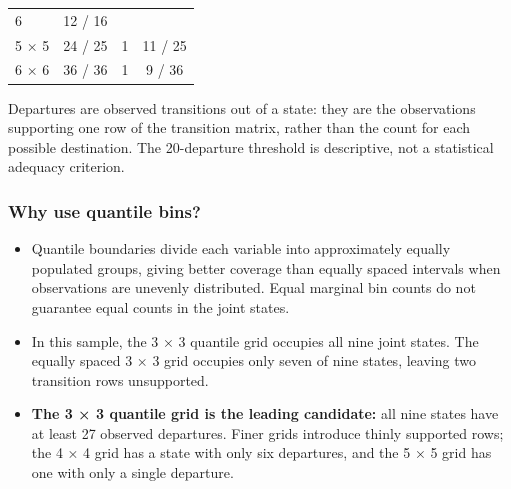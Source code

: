 \documentclass[10pt,]{article}
\providecommand{\tightlist}{%
  \setlength{\itemsep}{0pt}\setlength{\parskip}{0pt}}
\begin{document}
\begin{longtable}[]{@{}lccc@{}}
\begin{minipage}[t]{0.30\columnwidth}
6\strut
\end{minipage} & \begin{minipage}[t]{0.27\columnwidth}\centering\strut
12 / 16\strut
\end{minipage}\tabularnewline
\begin{minipage}[t]{0.14\columnwidth}\raggedright\strut
5 × 5\strut
\end{minipage} & \begin{minipage}[t]{0.18\columnwidth}\centering\strut
24 / 25\strut
\end{minipage} & \begin{minipage}[t]{0.30\columnwidth}\centering\strut
1\strut
\end{minipage} & \begin{minipage}[t]{0.27\columnwidth}\centering\strut
11 / 25\strut
\end{minipage}\tabularnewline
\begin{minipage}[t]{0.14\columnwidth}\raggedright\strut
6 × 6\strut
\end{minipage} & \begin{minipage}[t]{0.18\columnwidth}\centering\strut
36 / 36\strut
\end{minipage} & \begin{minipage}[t]{0.30\columnwidth}\centering\strut
1\strut
\end{minipage} & \begin{minipage}[t]{0.27\columnwidth}\centering\strut
9 / 36\strut
\end{minipage}\tabularnewline
\bottomrule
\end{longtable}

Departures are observed transitions out of a state: they are the
observations supporting one row of the transition matrix, rather than
the count for each possible destination. The 20-departure threshold is
descriptive, not a statistical adequacy criterion.

\subsubsection{Why use quantile bins?}\label{why-use-quantile-bins}

\begin{itemize}
\tightlist
\item
  Quantile boundaries divide each variable into approximately equally
  populated groups, giving better coverage than equally spaced intervals
  when observations are unevenly distributed. Equal marginal bin counts
  do not guarantee equal counts in the joint states.
\item
  In this sample, the 3 × 3 quantile grid occupies all nine joint
  states. The equally spaced 3 × 3 grid occupies only seven of nine
  states, leaving two transition rows unsupported.
\item
  \textbf{The 3 × 3 quantile grid is the leading candidate:} all nine
  states have at least 27 observed departures. Finer grids introduce
  thinly supported rows; the 4 × 4 grid has a state with only six
  departures, and the 5 × 5 grid has one with only a single departure.
\end{itemize}
\end{document}
